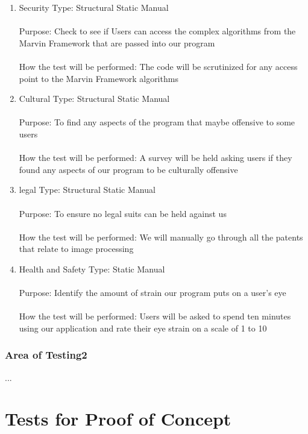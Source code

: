 \documentclass[12pt, titlepage]{article}
\begin{document}
\begin{enumerate}
\item{Security}
Type: Structural Static Manual\\ \\
Purpose: Check to see if Users can access the complex algorithms from the Marvin Framework that are passed into our program\\ \\
How the test will be performed: The code will be scrutinized for any access point to the Marvin Framework algorithms

\item{Cultural}
Type: Structural Static Manual\\ \\
Purpose: To find any aspects of the program that maybe offensive to some users\\ \\
How the test will be performed: A survey will be held asking users if they found any aspects of our program to be culturally offensive

\item{legal}
Type: Structural Static Manual\\ \\
Purpose: To ensure no legal suits can be held against us \\ \\
How the test will be performed: We will manually go through all the patents that relate to image processing

\item{Health and Safety}
Type: Static Manual\\ \\
Purpose: Identify the amount of strain our program puts on a user’s eye\\ \\
How the test will be performed: Users will be asked to spend ten minutes using our application and rate their eye strain on a scale of 1 to 10
 

\end{enumerate}

\subsubsection{Area of Testing2}

...

\section{Tests for Proof of Concept}
\end{document}
